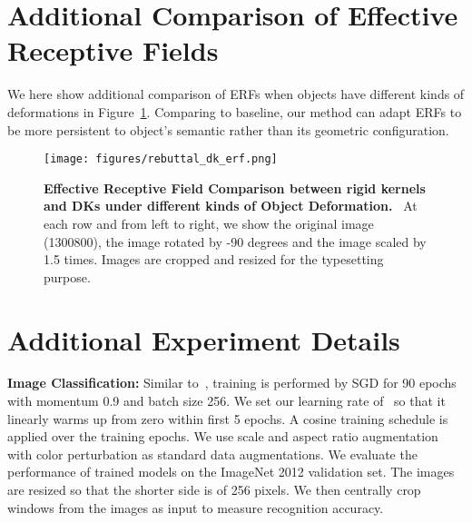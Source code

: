 \documentclass{article} \usepackage{iclr2020_conference, times}
\newcommand{\bfsection}[1]{\noindent\textbf{#1:}}
\newcommand{\captiont}[2]{\caption{\textbf{#1} #2}}
\begin{document}
\section{Additional Comparison of Effective Receptive Fields}
We here show additional comparison of ERFs when objects have different kinds
of deformations in Figure~\ref{fig:additional_erf_visualization}.
Comparing to baseline, our method can adapt ERFs to be more persistent to
object’s semantic rather than its geometric configuration.
\begin{figure}[t]
    \centering
    \texttt{[image: figures/rebuttal\_dk\_erf.png]}
    \captiont{
            Effective Receptive Field Comparison between rigid kernels and DKs
            under different kinds of Object Deformation.
        }{\
        At each row and from left to right, we show the original image
        (1300800), the image rotated by -90 degrees and the image scaled
        by 1.5 times.  Images are cropped and resized for the typesetting
        purpose.
    }\vspace{-0.5em}
    \label{fig:additional_erf_visualization}
\end{figure}


\section{Additional Experiment Details}
\bfsection{Image Classification}
Similar to~\citet{goyal2017accurate,loshchilov2016sgdr}, training is
performed by SGD for 90 epochs with momentum 0.9 and batch size 256.
We set our learning rate of~ so that it linearly warms up from zero within
first 5 epochs.
A cosine training schedule is applied over the training epochs.
We use scale and aspect ratio augmentation with color perturbation as
standard data augmentations.
We evaluate the performance of trained models on the ImageNet 2012 validation
set.
The images are resized so that the shorter side is of 256 pixels.
We then centrally crop~ windows from the images as input to
measure recognition accuracy.
 
\end{document}
